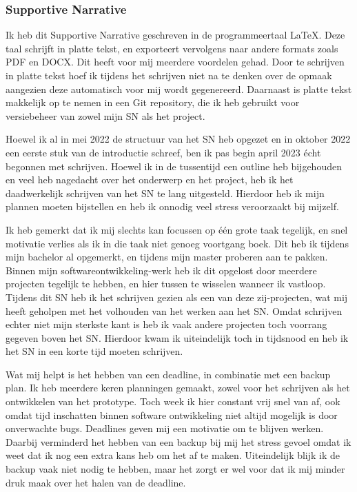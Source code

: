 \subsubsection*{Supportive Narrative}
Ik heb dit Supportive Narrative geschreven in de programmeertaal LaTeX. Deze taal schrijft in platte tekst, en exporteert vervolgens naar andere formats zoals PDF en DOCX. Dit heeft voor mij meerdere voordelen gehad. Door te schrijven in platte tekst hoef ik tijdens het schrijven niet na te denken over de opmaak aangezien deze automatisch voor mij wordt gegenereerd. Daarnaast is platte tekst makkelijk op te nemen in een Git repository, die ik heb gebruikt voor versiebeheer van zowel mijn SN als het project.

Hoewel ik al in mei 2022 de structuur van het SN heb opgezet en in oktober 2022 een eerste stuk van de introductie schreef, ben ik pas begin april 2023 écht begonnen met schrijven. Hoewel ik in de tussentijd een outline heb bijgehouden en veel heb nagedacht over het onderwerp en het project, heb ik het daadwerkelijk schrijven van het SN te lang uitgesteld. Hierdoor heb ik mijn plannen moeten bijstellen en heb ik onnodig veel stress veroorzaakt bij mijzelf. 

Ik heb gemerkt dat ik mij slechts kan focussen op één grote taak tegelijk, en snel motivatie verlies als ik in die taak niet genoeg voortgang boek. Dit heb ik tijdens mijn bachelor al opgemerkt, en tijdens mijn master proberen aan te pakken. Binnen mijn softwareontwikkeling-werk heb ik dit opgelost door meerdere projecten tegelijk te hebben, en hier tussen te wisselen wanneer ik vastloop. Tijdens dit SN heb ik het schrijven gezien als een van deze zij-projecten, wat mij heeft geholpen met het volhouden van het werken aan het SN. Omdat schrijven echter niet mijn sterkste kant is heb ik vaak andere projecten toch voorrang gegeven boven het SN. Hierdoor kwam ik uiteindelijk toch in tijdsnood en heb ik het SN in een korte tijd moeten schrijven.

Wat mij helpt is het hebben van een deadline, in combinatie met een backup plan. Ik heb meerdere keren planningen gemaakt, zowel voor het schrijven als het ontwikkelen van het prototype. Toch week ik hier constant vrij snel van af, ook omdat tijd inschatten binnen software ontwikkeling niet altijd mogelijk is door onverwachte bugs. Deadlines geven mij een motivatie om te blijven werken. Daarbij verminderd het hebben van een backup bij mij het stress gevoel omdat ik weet dat ik nog een extra kans heb om het af te maken. Uiteindelijk blijk ik de backup vaak niet nodig te hebben, maar het zorgt er wel voor dat ik mij minder druk maak over het halen van de deadline.

